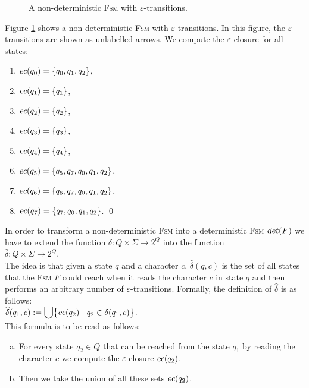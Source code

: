 \begin{figure}[!ht]
  \centering

   \caption{A non-deterministic \textsc{Fsm} with $\varepsilon$-transitions.}
  \label{fig:ab-or-ba-star.dot}
\end{figure}

\exampleEng
Figure \ref{fig:ab-or-ba-star.dot} shows a non-deterministic \textsc{Fsm} with 
$\varepsilon$-transitions.   In this figure, the $\varepsilon$-transitions are shown as unlabelled arrows.
We compute the $\varepsilon$-closure for all states:
\begin{enumerate}
\item $\textsl{ec}(q_0) = \{ q_0, q_1, q_2 \}$,
\item $\textsl{ec}(q_1) = \{ q_1 \}$,
\item $\textsl{ec}(q_2) = \{ q_2 \}$,
\item $\textsl{ec}(q_3) = \{ q_3 \}$,
\item $\textsl{ec}(q_4) = \{ q_4 \}$,
\item $\textsl{ec}(q_5) = \{ q_5, q_7, q_0, q_1, q_2 \}$,
\item $\textsl{ec}(q_6) = \{ q_6, q_7, q_0, q_1, q_2 \}$,
\item $\textsl{ec}(q_7) = \{ q_7, q_0, q_1, q_2 \}$.
      \qed
\end{enumerate}

\noindent
In order to transform a non-deterministic \textsc{Fsm} into a deterministic \textsc{Fsm}
$\textsl{det}(F)$ we have to extend the function $\delta:Q \times \Sigma \rightarrow 2^Q$ into the function
\\[0.2cm]
\hspace*{1.3cm}
$\widehat{\delta}: Q \times \Sigma \rightarrow 2^Q$.
\\[0.2cm]
The idea is that given a state $q$ and a character $c$,  $\widehat{\delta}(q,c)$ is the set of all states that the
\textsc{Fsm} $F$ could reach when it reads the character $c$ in state $q$ and then performs an arbitrary number
of $\varepsilon$-transitions.  Formally, the definition of $\widehat{\delta}$ is as follows:
\\[0.2cm]
\hspace*{1.3cm}
$\displaystyle \widehat{\delta}(q_1, c) := \bigcup \bigl\{ \textsl{ec}(q_2) \bigm| q_2 \in \delta(q_1, c) \bigr \}$.
\\[0.2cm]
This formula is to be read as follows:
\begin{enumerate}[(a)]
\item For every state $q_2 \in Q$ that can be reached from the state $q_1$ by reading the character $c$ we
      compute the $\varepsilon$-closure $\textsl{ec}(q_2)$.
\item Then we take the union of all these sets $\textsl{ec}(q_2)$.
\end{enumerate}

